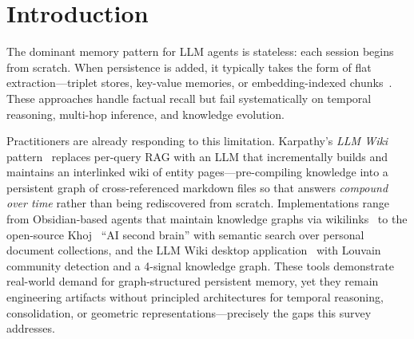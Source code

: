 \documentclass[hf]{ceurart}
\begin{document}
\maketitle


\section{Introduction}

The dominant memory pattern for LLM agents is stateless: each session
begins from scratch. When persistence is added, it typically takes the
form of flat extraction---triplet stores, key-value memories, or
embedding-indexed chunks~\cite{mem0_2025,packer2023}. These approaches
handle factual recall but fail systematically on temporal reasoning,
multi-hop inference, and knowledge evolution.

Practitioners are already responding to this limitation.
Karpathy's \emph{LLM Wiki} pattern~\cite{karpathyllmwiki2025} replaces
per-query RAG with an LLM that incrementally builds and maintains an
interlinked wiki of entity pages---pre-compiling knowledge into a
persistent graph of cross-referenced markdown files so that answers
\emph{compound over time} rather than being rediscovered from scratch.
Implementations range from Obsidian-based agents that maintain
knowledge graphs via
wikilinks~\cite{obsidianwiki2025,claudeobsidian2025} to the
open-source Khoj~\cite{khoj2025} ``AI second brain'' with semantic
search over personal document collections, and the LLM Wiki desktop
application~\cite{llmwikiapp2025} with Louvain community detection and
a 4-signal knowledge graph. These tools demonstrate real-world demand
for graph-structured persistent memory, yet they remain engineering
artifacts without principled architectures for temporal reasoning,
consolidation, or geometric representations---precisely the gaps this
survey addresses.
\end{document}
